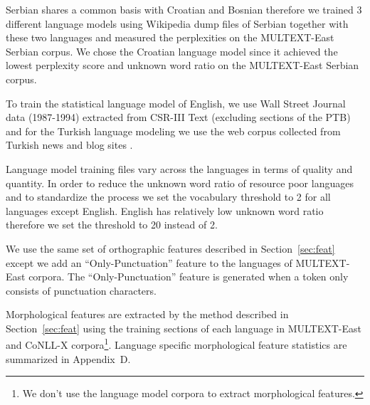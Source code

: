 Serbian shares a common basis with Croatian and Bosnian therefore we
trained 3 different language models using Wikipedia dump files of
Serbian together with these two languages and measured the
perplexities on the MULTEXT-East Serbian corpus.  We chose the
Croatian language model since it achieved the lowest perplexity score
and unknown word ratio on the MULTEXT-East Serbian corpus.

To train the statistical language model of English, we use Wall Street
Journal data (1987-1994) extracted from CSR-III Text \cite{csr3text}
(excluding sections of the PTB) and for the Turkish language modeling
we use the web corpus collected from Turkish news and blog sites
\cite{sak2008turkish}.

Language model training files vary across the languages in terms of
quality and quantity.  In order to reduce the unknown word ratio of
resource poor languages and to standardize the process we set the
vocabulary threshold to 2 for all languages except English.  English
has relatively low unknown word ratio therefore we set the threshold
to 20 instead of 2.

We use the same set of orthographic features described in
Section~\ref{sec:feat} except we add an ``Only-Punctuation'' feature
to the languages of MULTEXT-East corpora.  The ``Only-Punctuation''
feature is generated when a token only consists of punctuation
characters.

Morphological features are extracted by the method described in
Section~\ref{sec:feat} using the training sections of each language in
MULTEXT-East and CoNLL-X corpora\footnote{We don't use the language
  model corpora to extract morphological features.}.  Language
specific morphological feature statistics are summarized in
Appendix~D.


